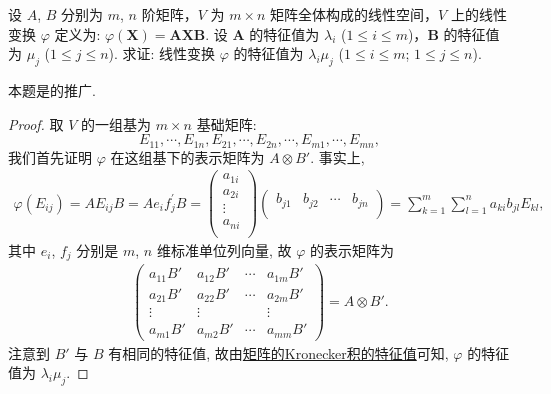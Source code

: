 \documentclass[../../main.tex]{subfiles}%
\begin{document}
\begin{proposition}\label{proposition:线性变换AXB的特征值}
设 $A$, $B$ 分别为 $m$, $n$ 阶矩阵，$V$ 为 $m\times n$ 矩阵全体构成的线性空间，$V$ 上的线性变换 $\varphi$ 定义为: $\varphi(\boldsymbol{X}) = \boldsymbol{A}\boldsymbol{X}\boldsymbol{B}$. 设 $\boldsymbol{A}$ 的特征值为 $\lambda_i$ ($1\leqslant  i\leqslant  m$)，$\boldsymbol{B}$ 的特征值为 $\mu_j$ ($1\leqslant  j\leqslant  n$). 求证: 线性变换 $\varphi$ 的特征值为 $\lambda_i\mu_j$ ($1\leqslant  i\leqslant  m$; $1\leqslant  j\leqslant  n$). 
\end{proposition}
\begin{remark}
本题是的推广.
\end{remark}
\begin{proof}

取 $V$ 的一组基为 $m\times n$ 基础矩阵:
\[
E_{11},\cdots,E_{1n},E_{21},\cdots,E_{2n},\cdots,E_{m1},\cdots,E_{mn},
\]
我们首先证明 $\varphi$ 在这组基下的表示矩阵为 $A\otimes B'$. 事实上,
\begin{align*}
\varphi (E_{ij})=AE_{ij}B=Ae_if_{j}^{\prime}B=\left( \begin{array}{c}
a_{1i}\\
a_{2i}\\
\vdots\\
a_{ni}\\
\end{array} \right) \left( \begin{matrix}
b_{j1}&		b_{j2}&		\cdots&		b_{jn}\\
\end{matrix} \right) =\sum_{k=1}^m{\sum_{l=1}^n{a_{ki}b_{jl}E_{kl},}}
\end{align*}
其中 $e_{i}$, $f_{j}$ 分别是 $m$, $n$ 维标准单位列向量, 故 $\varphi$ 的表示矩阵为
\begin{align*}
\begin{pmatrix}
a_{11}B' & a_{12}B' & \cdots & a_{1m}B' \\
a_{21}B' & a_{22}B' & \cdots & a_{2m}B' \\
\vdots & \vdots & & \vdots \\
a_{m1}B' & a_{m2}B' & \cdots & a_{mm}B'
\end{pmatrix}=A\otimes B'.
\end{align*}
注意到 $B'$ 与 $B$ 有相同的特征值, 故由\hyperref[proposition:矩阵的Kronecker积的特征值]{矩阵的Kronecker积的特征值}可知, $\varphi$ 的特征值为 $\lambda_{i}\mu_{j}$.

\end{proof}
\end{document}
